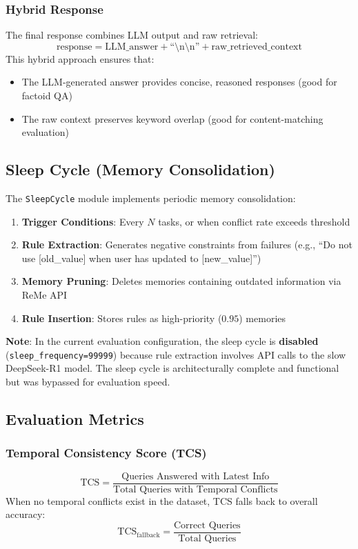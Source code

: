 \documentclass[11pt,a4paper]{article}
\begin{document}
\subsubsection{Hybrid Response}
The final response combines LLM output and raw retrieval:
\[
\text{response} = \text{LLM\_answer} + \text{``\textbackslash n\textbackslash n''} + \text{raw\_retrieved\_context}
\]
This hybrid approach ensures that:
\begin{itemize}
    \item The LLM-generated answer provides concise, reasoned responses (good for factoid QA)
    \item The raw context preserves keyword overlap (good for content-matching evaluation)
\end{itemize}

\subsection{Sleep Cycle (Memory Consolidation)}

The \texttt{SleepCycle} module implements periodic memory consolidation:

\begin{enumerate}
    \item \textbf{Trigger Conditions}: Every $N$ tasks, or when conflict rate exceeds threshold
    \item \textbf{Rule Extraction}: Generates negative constraints from failures (e.g., ``Do not use [old\_value] when user has updated to [new\_value]'')
    \item \textbf{Memory Pruning}: Deletes memories containing outdated information via ReMe API
    \item \textbf{Rule Insertion}: Stores rules as high-priority ($0.95$) memories
\end{enumerate}

\textbf{Note}: In the current evaluation configuration, the sleep cycle is \textbf{disabled} (\texttt{sleep\_frequency=99999}) because rule extraction involves API calls to the slow DeepSeek-R1 model. The sleep cycle is architecturally complete and functional but was bypassed for evaluation speed.

\subsection{Evaluation Metrics}

\subsubsection{Temporal Consistency Score (TCS)}
\[
\text{TCS} = \frac{\text{Queries Answered with Latest Info}}{\text{Total Queries with Temporal Conflicts}}
\]
When no temporal conflicts exist in the dataset, TCS falls back to overall accuracy:
\[
\text{TCS}_{\text{fallback}} = \frac{\text{Correct Queries}}{\text{Total Queries}}
\]
\end{document}
